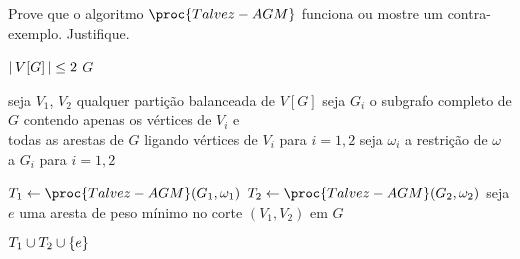 Prove que o algoritmo $\proc{Talvez-AGM}$ funciona ou mostre um contra-exemplo.
Justifique.

\begin{codebox}

    \li \Se ${\left\lvert\,V[G]\,\right\rvert} \leq 2$ \Entao \Devolva $G$

    \li seja $V_1$, $V_2$ qualquer partição balanceada de $V[G]$
    \li seja $G_i$ o subgrafo completo de $G$ contendo apenas os vértices de $V_i$ e \\
    \qquad todas as arestas de $G$ ligando vértices de $V_i$ para $i=1,2$
    \li seja $\omega_i$ a restrição de $\omega$ a $G_i$ para $i=1,2$

    \li $T_1 \Recebe \proc{Talvez-AGM}(G_1, \omega_1)$
    \li $T_2 \Recebe \proc{Talvez-AGM}(G_2, \omega_2)$
    \li seja $e$ uma aresta de peso mínimo no corte $(V_1, V_2)$ em $G$

    \li \Devolva $T_1 \cup T_2 \cup \set{e}$
\end{codebox}

\itemdsep
